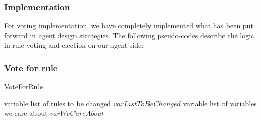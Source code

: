\subsubsection{Implementation} \label{subsubsec:Team6_Voting:Implementation}
For voting implementation, we have completely implemented what has been put forward in agent design strategies. The following pseudo-codes describe the logic in rule voting and election on our agent side:
\subsubsection{Vote for rule}
\begin{algorithm}[H]
    \caption{VoteForRule} 
        variable list of rules to be changed $varListToBeChanged$\;
        variable list of variables we care about  $varWeCareAbout$\;
    \end{algorithm}

